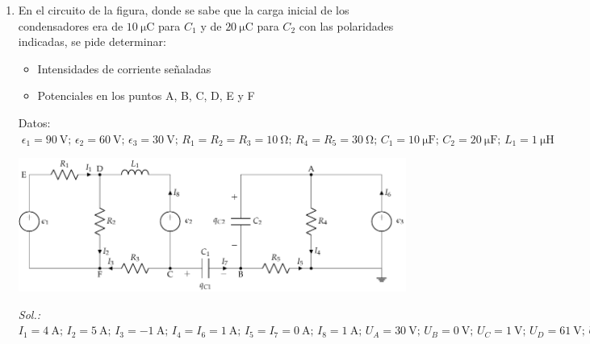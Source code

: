 \begin{enumerate}
  \emph{Sol.:\;
    $U_A=\qty{15}{\volt};\, U_B=\qty{11}{\volt};\, U_C=U_D=\qty{0}{\volt};\, I_1=I_6=\qty{0}{\ampere};\, I_2=I_4=\qty{-1}{\ampere};\, I_3=I_5=\qty{1}{\ampere};\,
    q_1=\qty{9}{\micro\coulomb};\, q_2=\qty{30}{\micro\coulomb};\, q_3=\qty{33}{\micro\coulomb};\, E_{C1}=\qty{40.5}{\micro\joule};\,
    E_{C2}=\qty{225}{\micro\joule};\, E_{C2}=\qty{181.5}{\micro\joule}$}

\item En el circuito de la figura, donde se sabe
  que la carga inicial de los condensadores era de
  $\qty{10}{\micro\coulomb}$ para $C_1$ y de
  $\qty{20}{\micro\coulomb}$ para $C_2$ con las polaridades indicadas,
  se pide determinar:
  \begin{itemize}
  \item Intensidades de corriente señaladas
  \item Potenciales en los puntos A, B, C, D, E y F
  \end{itemize}

  Datos:
  $\;\epsilon_1=\SI{90}{\volt};\, \epsilon_2=\SI{60}{\volt};\,
  \epsilon_3=\SI{30}{\volt};\, R_{1}= R_2 = R_3 =
  \SI{10}{\ohm};\, R_{4}= R_5 = \SI{30}{\ohm};\, C_{1}=
  \SI{10}{\micro\farad};\, C_{2}= \SI{20}{\micro\farad};\, L_1 =
  \SI{1}{\micro\henry}$

  \begin{center}
    \includegraphics[scale = 0.9]{../figs/mallas_carga_inicial.pdf}
  \end{center}

\emph{Sol.:\;
  $I_1=\qty{4}{\ampere};\, I_2=\qty{5}{\ampere};\, I_3=\qty{-1}{\ampere};\, I_4=I_6=\qty{1}{\ampere};\, I_5=I_7=\qty{0}{\ampere};\, I_8=\qty{1}{\ampere};\, U_A=\qty{30}{\volt};\, U_B=\qty{0}{\volt};\,
  U_C=\qty{1}{\volt};\, U_D=\qty{61}{\volt};\, U_E=\qty{101}{\volt};\, U_F=\qty{11}{\volt};\,$}


\end{enumerate}
